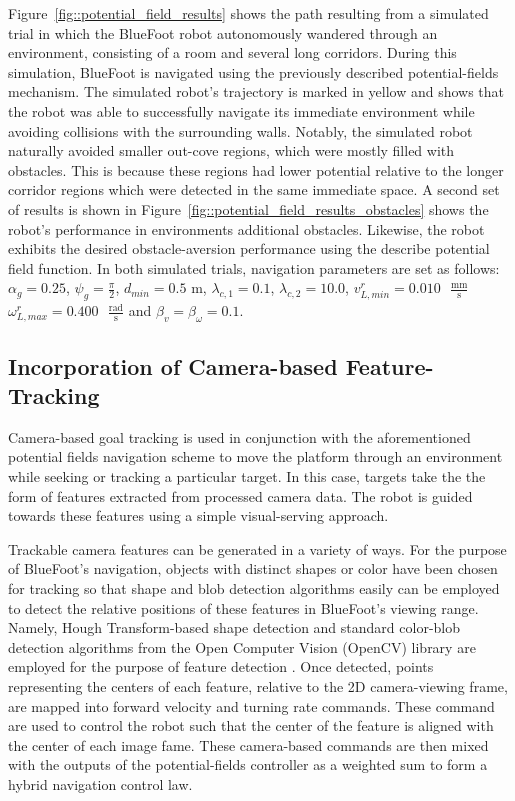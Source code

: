 			Figure~\ref{fig::potential_field_results} shows the path resulting from a simulated trial in which the BlueFoot robot autonomously wandered through an environment, consisting of a room and several long corridors. During this simulation, BlueFoot is navigated using the previously described potential-fields mechanism. The simulated robot's trajectory is marked in yellow and shows that the robot was able to successfully navigate its immediate environment while avoiding collisions with the surrounding walls. Notably, the simulated robot naturally avoided smaller out-cove regions, which were mostly filled with obstacles. This is because these regions had lower potential relative to the longer corridor regions which were detected in the same immediate space. A second set of results is shown in Figure~\ref{fig::potential_field_results_obstacles} shows the robot's performance in environments additional obstacles. Likewise, the robot exhibits the desired obstacle-aversion performance using the describe potential field function. In both simulated trials, navigation parameters are set as follows: 
				$\alpha_{g}=0.25$,
				$\psi_{g}=\frac{\pi}{2}$,
				$d_{min}=0.5\text{ m}$,
				$\lambda_{c,1}=0.1$,
				$\lambda_{c,2}=10.0$, 
				$v_{L,min}^{r}=0.010\text{ }\frac{\text{mm}}{\text{s}}$
				$\omega_{L,max}^{r}=0.400\text{ }\frac{\text{rad}}{\text{s}}$
				and
				$\beta_{v}=\beta_{\omega}=0.1$.


		\subsection{Incorporation of Camera-based Feature-Tracking}
		
			Camera-based goal tracking is used in conjunction with the aforementioned potential fields navigation scheme to move the platform through an environment while seeking or tracking a particular target. In this case, targets take the the form of features extracted from processed camera data. The robot is guided towards these features using a simple visual-serving approach. 

			Trackable camera features can be generated in a variety of ways. For the purpose of BlueFoot's navigation, objects with distinct shapes or color have been chosen for tracking so that shape and blob detection algorithms easily can be employed to detect the relative positions of these features in BlueFoot's viewing range. Namely, Hough Transform-based shape detection and standard color-blob detection algorithms from the Open Computer Vision (OpenCV) library are employed for the purpose of feature detection \cite{opencv_library}. Once detected, points representing the centers of each feature, relative to the 2D camera-viewing frame, are mapped into forward velocity and turning rate commands. These command are used to control the robot such that the center of the feature is aligned with the center of each image fame. These camera-based commands are then mixed with the outputs of the potential-fields controller as a weighted sum to form a hybrid navigation control law.

